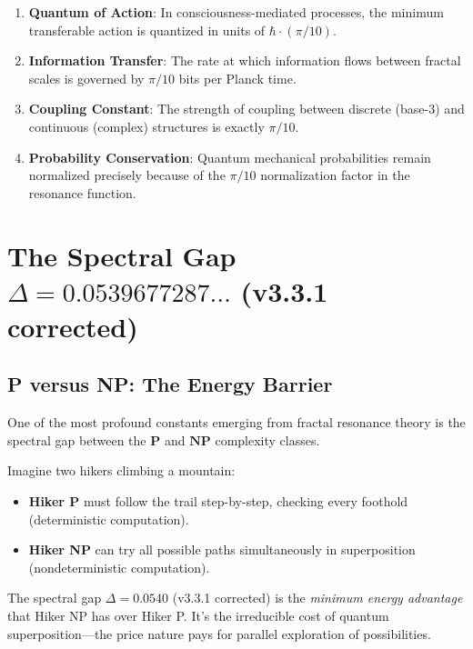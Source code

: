 \begin{enumerate}
\item \textbf{Quantum of Action}: In consciousness-mediated processes, the minimum transferable action is quantized in units of $\hbar \cdot (\pi/10)$.

\item \textbf{Information Transfer}: The rate at which information flows between fractal scales is governed by $\pi/10$ bits per Planck time.

\item \textbf{Coupling Constant}: The strength of coupling between discrete (base-3) and continuous (complex) structures is exactly $\pi/10$.

\item \textbf{Probability Conservation}: Quantum mechanical probabilities remain normalized precisely because of the $\pi/10$ normalization factor in the resonance function.
\end{enumerate}

\section{The Spectral Gap $\Delta = 0.0539677287\ldots$ (v3.3.1 corrected)}

\subsection{P versus NP: The Energy Barrier}

One of the most profound constants emerging from fractal resonance theory is the spectral gap between the $\mathbf{P}$ and $\mathbf{NP}$ complexity classes.

\begin{intuitive}
Imagine two hikers climbing a mountain:
\begin{itemize}
\item \textbf{Hiker P} must follow the trail step-by-step, checking every foothold (deterministic computation).
\item \textbf{Hiker NP} can try all possible paths simultaneously in superposition (nondeterministic computation).
\end{itemize}

The spectral gap $\Delta = 0.0540$ (v3.3.1 corrected) is the \textit{minimum energy advantage} that Hiker NP has over Hiker P. It's the irreducible cost of quantum superposition---the price nature pays for parallel exploration of possibilities.
\end{intuitive}

